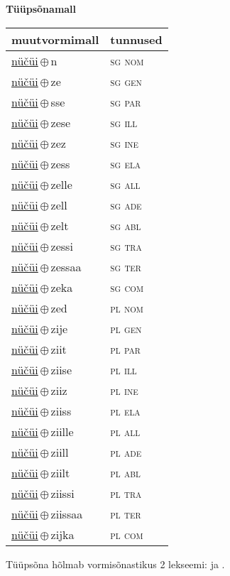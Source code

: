 

\vspace{3.5em}
\noindent \begin{minipage}{\textwidth}
\noindent \textbf{Tüüpsõnamall \,}\\

\begin{sideways}
\begin{tabular}{l l}
muutvormimall & tunnused \\
\hline
\underline{nüčüi}\,$\oplus$\,n & \textsc{ sg nom } \\
\underline{nüčüi}\,$\oplus$\,ze & \textsc{ sg gen } \\
\underline{nüčüi}\,$\oplus$\,sse & \textsc{ sg par } \\
\underline{nüčüi}\,$\oplus$\,zese & \textsc{ sg ill } \\
\underline{nüčüi}\,$\oplus$\,zez & \textsc{ sg ine } \\
\underline{nüčüi}\,$\oplus$\,zess & \textsc{ sg ela } \\
\underline{nüčüi}\,$\oplus$\,zelle & \textsc{ sg all } \\
\underline{nüčüi}\,$\oplus$\,zell & \textsc{ sg ade } \\
\underline{nüčüi}\,$\oplus$\,zelt & \textsc{ sg abl } \\
\underline{nüčüi}\,$\oplus$\,zessi & \textsc{ sg tra } \\
\underline{nüčüi}\,$\oplus$\,zessaa & \textsc{ sg ter } \\
\underline{nüčüi}\,$\oplus$\,zeka & \textsc{ sg com } \\
\underline{nüčüi}\,$\oplus$\,zed & \textsc{ pl nom } \\
\underline{nüčüi}\,$\oplus$\,zije & \textsc{ pl gen } \\
\underline{nüčüi}\,$\oplus$\,ziit & \textsc{ pl par } \\
\underline{nüčüi}\,$\oplus$\,ziise & \textsc{ pl ill } \\
\underline{nüčüi}\,$\oplus$\,ziiz & \textsc{ pl ine } \\
\underline{nüčüi}\,$\oplus$\,ziiss & \textsc{ pl ela } \\
\underline{nüčüi}\,$\oplus$\,ziille & \textsc{ pl all } \\
\underline{nüčüi}\,$\oplus$\,ziill & \textsc{ pl ade } \\
\underline{nüčüi}\,$\oplus$\,ziilt & \textsc{ pl abl } \\
\underline{nüčüi}\,$\oplus$\,ziissi & \textsc{ pl tra } \\
\underline{nüčüi}\,$\oplus$\,ziissaa & \textsc{ pl ter } \\
\underline{nüčüi}\,$\oplus$\,zijka & \textsc{ pl com } \\
\end{tabular}
\end{sideways}
\label{tab:tüüpsõnamall-nüčüin}

\end{minipage}

 
\vspace{1em}
\noindent Tüüpsõna hõlmab vormisõnastikus 2 lekseemi:  ja .
